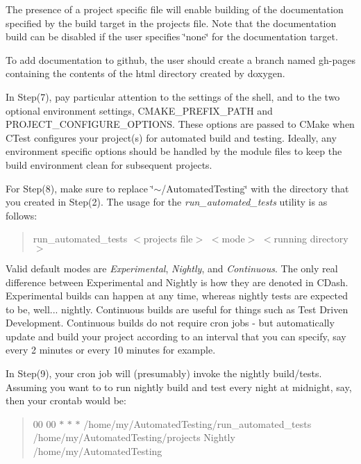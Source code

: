 The presence of a project specific file will enable building of the documentation specified by the build target in the projects file. Note that the documentation build can be disabled if the user specifies \char`\"{}none\char`\"{} for the documentation target.

To add documentation to github, the user should create a branch named gh-\/pages containing the contents of the html directory created by doxygen.

In Step(7), pay particular attention to the settings of the shell, and to the two optional environment settings, {\ttfamily C\+M\+A\+K\+E\+\_\+\+P\+R\+E\+F\+I\+X\+\_\+\+P\+A\+TH} and {\ttfamily P\+R\+O\+J\+E\+C\+T\+\_\+\+C\+O\+N\+F\+I\+G\+U\+R\+E\+\_\+\+O\+P\+T\+I\+O\+NS}. These options are passed to C\+Make when C\+Test configures your project(s) for automated build and testing. Ideally, any environment specific options should be handled by the module files to keep the build environment clean for subsequent projects.

For Step(8), make sure to replace \char`\"{}$\sim$/\+Automated\+Testing\char`\"{} with the directory that you created in Step(2). The usage for the {\itshape run\+\_\+automated\+\_\+tests} utility is as follows\+:

\begin{quote}
run\+\_\+automated\+\_\+tests $<$projects file$>$ $<$mode$>$ $<$running directory$>$ \end{quote}


Valid default modes are {\itshape Experimental}, {\itshape Nightly}, and {\itshape Continuous}. The only real difference between Experimental and Nightly is how they are denoted in C\+Dash. Experimental builds can happen at any time, whereas nightly tests are expected to be, well... nightly. Continuous builds are useful for things such as Test Driven Development. Continuous builds do not require cron jobs -\/ but automatically update and build your project according to an interval that you can specify, say every 2 minutes or every 10 minutes for example.

In Step(9), your cron job will (presumably) invoke the nightly build/tests. Assuming you want to to run nightly build and test every night at midnight, say, then your crontab would be\+:

\begin{quote}
00 00 $\ast$ $\ast$ $\ast$ /home/my/\+Automated\+Testing/run\+\_\+automated\+\_\+tests /home/my/\+Automated\+Testing/projects Nightly /home/my/\+Automated\+Testing \end{quote}


